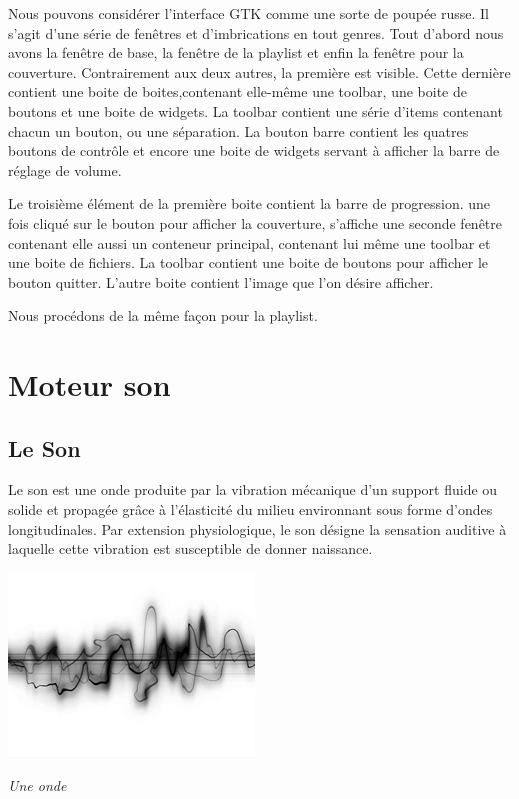 \documentclass[12pt,a4paper]{report}
\begin{document}
Nous pouvons considérer l'interface GTK comme une sorte de poupée russe. Il s'agit d'une série de fenêtres et d'imbrications en tout genres.
Tout d'abord nous avons la fenêtre de base, la fenêtre de la playlist et enfin la fenêtre pour la couverture. Contrairement aux deux autres, la première est visible.
Cette dernière contient une boite de boites,contenant elle-même une toolbar, une boite de boutons et une boite de widgets. La toolbar contient une série d'items contenant chacun un bouton, ou une séparation.
La bouton barre contient les quatres boutons de contrôle et encore une boite de widgets servant à afficher la barre de réglage de volume.

Le troisième élément de la première boite contient la barre de progression.
une fois cliqué sur le bouton pour afficher la couverture, s'affiche une seconde fenêtre contenant elle aussi un conteneur principal, contenant lui même une toolbar et une boite de fichiers. La toolbar contient une boite de boutons pour afficher le bouton quitter. L'autre boite contient l'image que l'on désire afficher.

Nous procédons de la même façon pour la playlist.

\chapter{Moteur son}
\section{Le Son}

Le son est une onde produite par la vibration mécanique d'un support fluide ou solide et propagée grâce à l'élasticité du milieu environnant sous forme d'ondes longitudinales. Par extension physiologique, le son désigne la sensation auditive à laquelle cette vibration est susceptible de donner naissance.\\
\begin{center}

\includegraphics[scale=0.7]{onde.jpg}

\it{Une onde}
\end{center}
\end{document}
